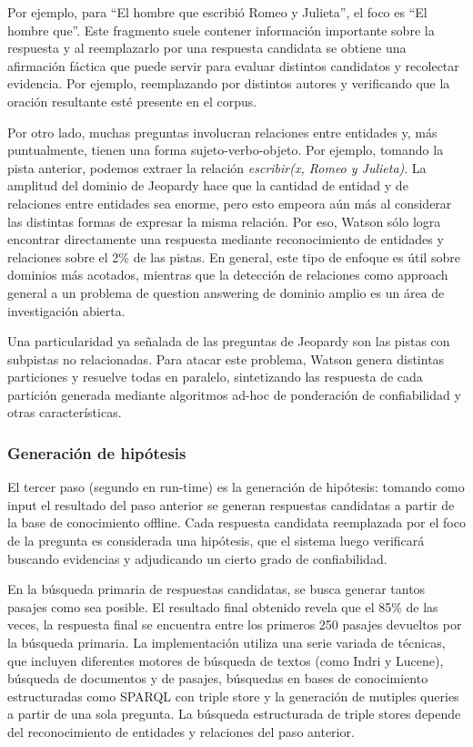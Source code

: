 Por ejemplo, para {\textquotedblleft}El hombre que escribió Romeo y
Julieta{\textquotedblright}, el foco es {\textquotedblleft}El hombre
que{\textquotedblright}. Este fragmento suele contener información
importante sobre la respuesta y al reemplazarlo por una respuesta
candidata se obtiene una afirmación fáctica que puede servir para
evaluar distintos candidatos y recolectar evidencia. Por ejemplo,
reemplazando por distintos autores y verificando que la oración
resultante esté presente en el corpus.

Por otro lado, muchas preguntas involucran relaciones entre entidades y,
más puntualmente, tienen una forma sujeto-verbo-objeto. Por ejemplo,
tomando la pista anterior, podemos extraer la relación
\textit{escribir(x, Romeo y Julieta)}. La amplitud del dominio de
Jeopardy hace que la cantidad de entidad y de relaciones entre
entidades sea enorme, pero esto empeora aún más al considerar las
distintas formas de expresar la misma relación. Por eso, Watson
sólo logra encontrar directamente una respuesta mediante
reconocimiento de entidades y relaciones sobre el 2\% de las pistas. En
general, este tipo de enfoque es útil sobre dominios más acotados,
mientras que la detección de relaciones como approach general a un
problema de question answering de dominio amplio es un área de
investigación abierta. 

Una particularidad ya señalada de las preguntas de Jeopardy son las
pistas con subpistas no relacionadas. Para atacar este problema, Watson
genera distintas particiones y resuelve todas en paralelo, sintetizando
las respuesta de cada partición generada mediante algoritmos ad-hoc
de ponderación de confiabilidad y otras características.

\subsubsection{Generación de hipótesis}

El tercer paso (segundo en run-time) es la generación de hipótesis:
tomando como input el resultado del paso anterior se generan respuestas
candidatas a partir de la base de conocimiento offline. Cada respuesta
candidata reemplazada por el foco de la pregunta es considerada una
hipótesis, que el sistema luego verificará buscando evidencias y
adjudicando un cierto grado de confiabilidad.

En la búsqueda primaria de respuestas candidatas, se busca generar
tantos pasajes como sea posible. El resultado final obtenido revela que
el 85\% de las veces, la respuesta final se encuentra entre los
primeros 250 pasajes devueltos por la búsqueda primaria. La
implementación utiliza una serie variada de técnicas, que incluyen
diferentes motores de búsqueda de textos (como Indri y Lucene),
búsqueda de documentos y de pasajes, búsquedas en bases de
conocimiento estructuradas como SPARQL con triple store y la
generación de mutiples queries a partir de una sola pregunta. La
búsqueda estructurada de triple stores depende del reconocimiento de
entidades y relaciones del paso anterior.

